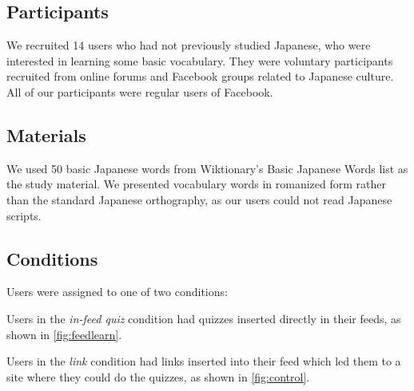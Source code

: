 \documentclass{chi-ext}
\begin{document}

\subsection{Participants}

We recruited 14 users who had not previously studied Japanese, who were interested in learning some basic vocabulary. They were voluntary participants recruited from online forums and Facebook groups related to Japanese culture. All of our participants were regular users of Facebook. %


\subsection{Materials}

We used 50 basic Japanese words from Wiktionary's Basic Japanese Words list as the study material. We presented vocabulary words in romanized form rather than the standard Japanese orthography, as our users could not read Japanese scripts.


\subsection{Conditions}

Users were assigned to one of two conditions:

\begin{compactitem}
\item Users in the \textit{in-feed quiz} condition had quizzes inserted directly in their feeds, as shown in \autoref{fig:feedlearn}.
\item Users in the \textit{link} condition had links inserted into their feed which led them to a site where they could do the quizzes, as shown in \autoref{fig:control}.
\end{compactitem}
\end{document}

